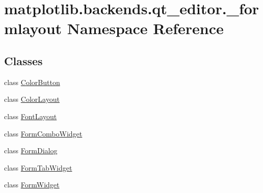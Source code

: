 \hypertarget{namespacematplotlib_1_1backends_1_1qt__editor_1_1__formlayout}{}\section{matplotlib.\+backends.\+qt\+\_\+editor.\+\_\+formlayout Namespace Reference}
\label{namespacematplotlib_1_1backends_1_1qt__editor_1_1__formlayout}
\subsection*{Classes}
\begin{DoxyCompactItemize}
\item 
class \hyperlink{classmatplotlib_1_1backends_1_1qt__editor_1_1__formlayout_1_1ColorButton}{Color\+Button}
\item 
class \hyperlink{classmatplotlib_1_1backends_1_1qt__editor_1_1__formlayout_1_1ColorLayout}{Color\+Layout}
\item 
class \hyperlink{classmatplotlib_1_1backends_1_1qt__editor_1_1__formlayout_1_1FontLayout}{Font\+Layout}
\item 
class \hyperlink{classmatplotlib_1_1backends_1_1qt__editor_1_1__formlayout_1_1FormComboWidget}{Form\+Combo\+Widget}
\item 
class \hyperlink{classmatplotlib_1_1backends_1_1qt__editor_1_1__formlayout_1_1FormDialog}{Form\+Dialog}
\item 
class \hyperlink{classmatplotlib_1_1backends_1_1qt__editor_1_1__formlayout_1_1FormTabWidget}{Form\+Tab\+Widget}
\item 
class \hyperlink{classmatplotlib_1_1backends_1_1qt__editor_1_1__formlayout_1_1FormWidget}{Form\+Widget}
\end{DoxyCompactItemize}
